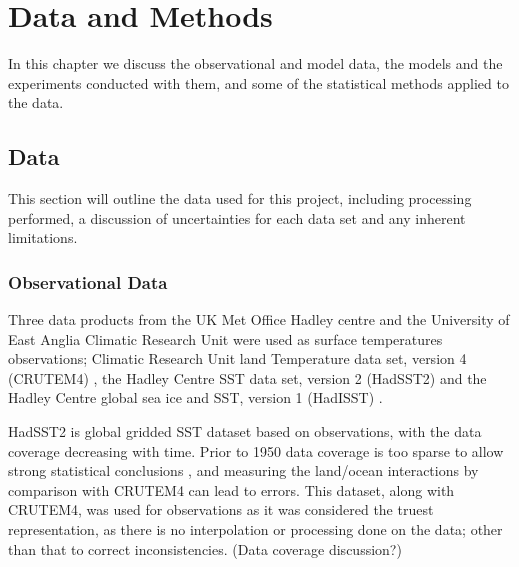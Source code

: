 \chapter{Data and Methods} %

\label{methods} %


In this chapter we discuss the observational and model data, the models and the 
experiments conducted with them, and some of the statistical methods applied to 
the data.


\section{Data}

This section will outline the data used for this project, including processing 
performed, a discussion of uncertainties for each data set and any inherent 
limitations.

\subsection{Observational Data}

Three data products from the UK Met Office Hadley centre and the University of 
East Anglia Climatic Research Unit were used as surface temperatures 
observations; Climatic Research Unit land Temperature data set, version 
4 (CRUTEM4) \citep{Brohan2006}, the Hadley Centre SST data set,
version 2 (HadSST2) \citep{Rayner2006} and the Hadley Centre global sea ice and 
SST, version 1 (HadISST) \citep{Rayner2003}. 

HadSST2 is global gridded SST dataset based on observations, with the data 
coverage decreasing with time. Prior to 1950 data coverage is too sparse to 
allow strong statistical conclusions \citep{Dommenget2009}, and measuring the 
land/ocean interactions by comparison with CRUTEM4 can lead to errors. This 
dataset, along with CRUTEM4, was used for observations as it was considered the 
truest representation, as there is no interpolation or processing done on the 
data; other than that to correct inconsistencies. (Data coverage discussion?)

